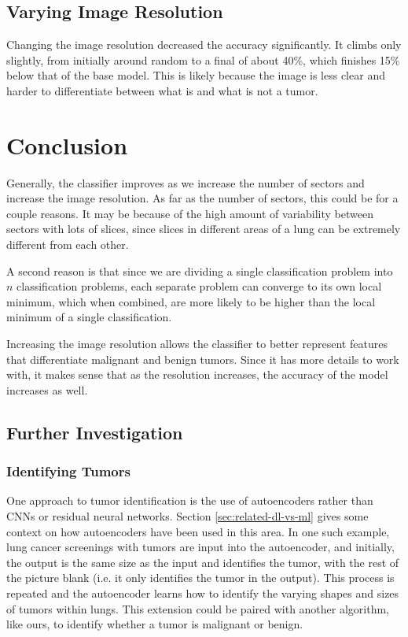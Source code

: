 \documentclass[10pt,twocolumn,letterpaper]{article}
\begin{document}
   \subsection{Varying Image Resolution} \label{sec:results-res}

		Changing the image resolution decreased the accuracy significantly. It climbs only slightly, from initially around random to a final of about 40\%, which finishes 15\% below that of the base model. This is likely because the image is less clear and harder to differentiate between what is and what is not a tumor.

\section{Conclusion} \label{sec:conclusion}

   Generally, the classifier improves as we increase the number of sectors and increase the image resolution. As far as the number of sectors, this could be for a couple reasons. It may be because of the high amount of variability between sectors with lots of slices, since slices in different areas of a lung can be extremely different from each other.

   A second reason is that since we are dividing a single classification problem into $n$ classification problems, each separate problem can converge to its own local minimum, which when combined, are more likely to be higher than the local minimum of a single classification.

   Increasing the image resolution allows the classifier to better represent features that differentiate malignant and benign tumors. Since it has more details to work with, it makes sense that as the resolution increases, the accuracy of the model increases as well.

   \subsection{Further Investigation} \label{sec:further}

      \subsubsection{Identifying Tumors} \label{sec:id-tumor}

         One approach to tumor identification is the use of autoencoders rather than CNNs or residual neural networks. Section \ref{sec:related-dl-vs-ml} gives some context on how autoencoders have been used in this area. In one such example, lung cancer screenings with tumors are input into the autoencoder, and initially, the output is the same size as the input and identifies the tumor, with the rest of the picture blank (i.e. it only identifies the tumor in the output). This process is repeated and the autoencoder learns how to identify the varying shapes and sizes of tumors within lungs. This extension could be paired with another algorithm, like ours, to identify whether a tumor is malignant or benign.
\end{document}
